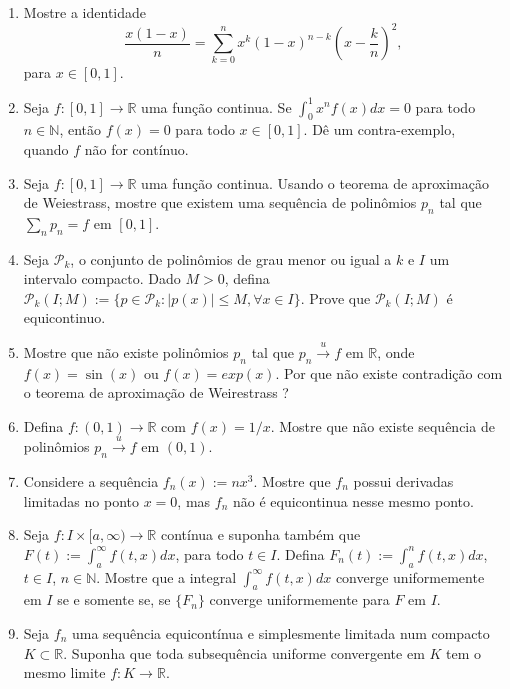 \documentclass{article}
\begin{document}
    \begin{enumerate}
      \item Mostre a identidade 
      $$ \frac{x(1-x)}{n}= \sum_{k=0}^{n}
         x^k(1-x)^{n-k}\left(x-\frac{k}{n}\right)^2,  $$
       para $x \in [0,1]$.  
       \item Seja $f:[0,1]\rightarrow \mathbb{R}$ uma função continua. Se $\int_{0}^{1} x^{n} f(x)dx=0$ para todo $n \in \mathbb{N}$, então $f(x)=0$ para todo $x \in [0,1]$.  
       Dê um contra-exemplo, quando $f$ não for contínuo.  
       \item Seja $f:[0,1]\rightarrow \mathbb{R}$ uma função continua. Usando o teorema de aproximação de Weiestrass, 
       mostre que existem uma sequência de polinômios $p_{n}$
       tal que $\sum_{n} p_{n}=f$ em $[0,1]$.
      \item Seja $\mathcal{P}_{k}$, o conjunto de polinômios de grau menor ou igual a $k$ e $I$ um intervalo compacto. 
      Dado $M>0$, defina   
      $\mathcal{P}_{k}(I;M):=\{p \in \mathcal{P}_{k}:
      |p(x)|\leq M, \forall x \in I\}$.
      Prove que $\mathcal{P}_{k}(I;M)$ é equicontinuo. 
      \item Mostre que não existe polinômios $p_{n}$ tal que 
      $p_{n} \xrightarrow{u} f$ em $\mathbb{R}$, onde 
      $f(x)=\sin(x)$ ou $f(x)=exp(x)$. Por que não existe contradição com o teorema de aproximação de Weirestrass ?
      \item Defina $f:(0,1)\rightarrow \mathbb{R}$ com 
      $f(x)=1/x$. Mostre que não existe sequência de polinômios
       $p_{n} \xrightarrow{u} f$ em $(0,1)$.
      \item Considere a sequência $f_{n}(x):=nx^3$. 
      Mostre que $f_{n}$ possui derivadas limitadas 
      no ponto $x=0$, mas $f_{n}$ não é equicontinua 
      nesse mesmo ponto.    
      \item Seja $f: I \times [a,\infty) \rightarrow \mathbb{R}$
      contínua e suponha também que 
      $F(t):=\int_{a}^{\infty} f(t,x)dx$, para todo $t \in I$.
      Defina $F_n(t):=\int_{a}^{n} f(t,x)dx$, $t \in I$, 
      $n \in \mathbb{N}$. 
      Mostre que a integral 
      $\int_{a}^{\infty} f(t,x)dx$
      converge uniformemente em $I$ se e somente se, 
      se $\{F_{n}\}$ converge uniformemente para $F$ em $I$.
      \item Seja $f_{n}$ uma sequência equicontínua e simplesmente limitada num compacto $K \subset \mathbb{R}$. 
      Suponha que toda subsequência uniforme convergente em $K$  tem o mesmo limite $f:K \rightarrow \mathbb{R}$. 

\end{enumerate}
\end{document}
